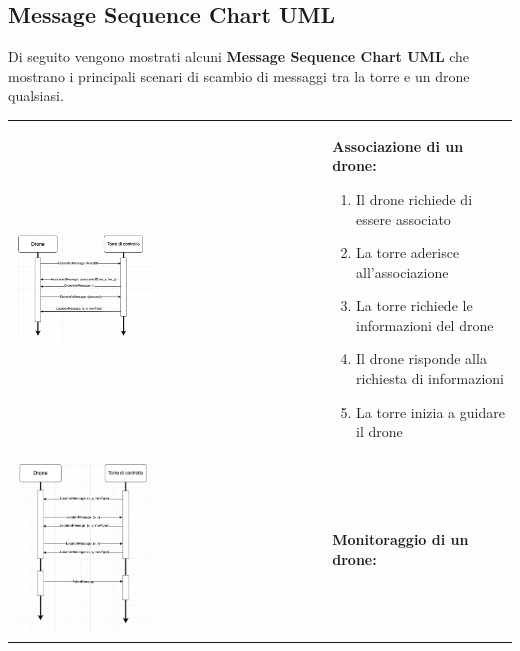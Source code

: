 \documentclass[a4paper, 11pt]{article}
\begin{document}
\subsection{Message Sequence Chart UML}
Di seguito vengono mostrati alcuni \textbf{Message Sequence Chart UML} che mostrano i principali scenari di scambio di messaggi tra la torre e un drone qualsiasi.



\begin{tabular}{m{} p{}}
    \includegraphics[width=0.45\textwidth]{image/associatedUML_MSC.png}&\textbf{Associazione di un drone:}
    \begin{enumerate}
        \item Il drone richiede di essere associato 
        \item La torre aderisce all'associazione
        \item La torre richiede le informazioni del drone
        \item Il drone risponde alla richiesta di informazioni 
        \item La torre inizia a guidare il drone 
    \end{enumerate}\\
    \includegraphics[width=0.45\textwidth]{image/monitoringUML_MSC.png} &\textbf{Monitoraggio di un drone:}

\end{tabular}
\end{document}
